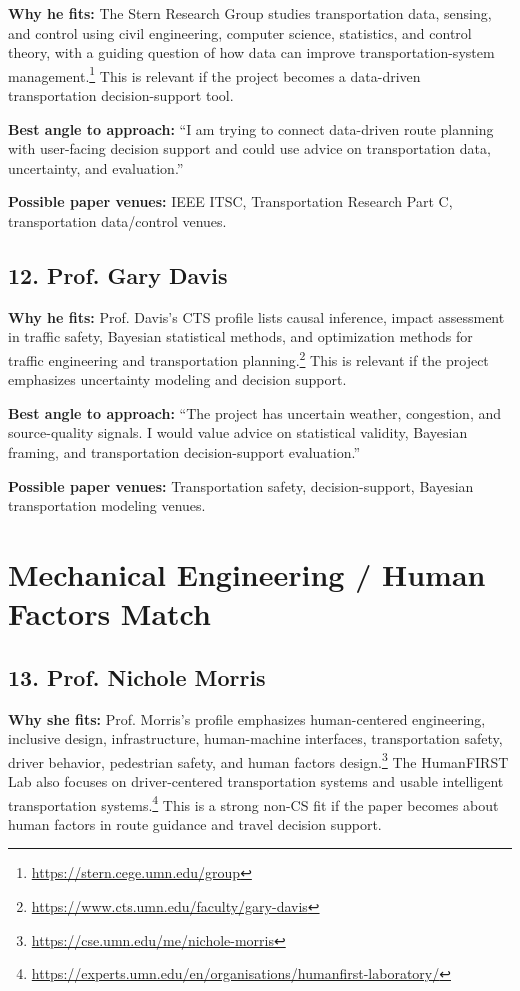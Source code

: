 \documentclass[11pt,a4paper]{article}
\begin{document}
\noindent \textbf{Why he fits:} The Stern Research Group studies transportation data, sensing, and control using civil engineering, computer science, statistics, and control theory, with a guiding question of how data can improve transportation-system management.\footnote{\url{https://stern.cege.umn.edu/group}} This is relevant if the project becomes a data-driven transportation decision-support tool.

\noindent \textbf{Best angle to approach:} ``I am trying to connect data-driven route planning with user-facing decision support and could use advice on transportation data, uncertainty, and evaluation.''

\noindent \textbf{Possible paper venues:} IEEE ITSC, Transportation Research Part C, transportation data/control venues.

\subsection*{12. Prof. Gary Davis}

\noindent \textbf{Why he fits:} Prof. Davis's CTS profile lists causal inference, impact assessment in traffic safety, Bayesian statistical methods, and optimization methods for traffic engineering and transportation planning.\footnote{\url{https://www.cts.umn.edu/faculty/gary-davis}} This is relevant if the project emphasizes uncertainty modeling and decision support.

\noindent \textbf{Best angle to approach:} ``The project has uncertain weather, congestion, and source-quality signals. I would value advice on statistical validity, Bayesian framing, and transportation decision-support evaluation.''

\noindent \textbf{Possible paper venues:} Transportation safety, decision-support, Bayesian transportation modeling venues.

\section*{Mechanical Engineering / Human Factors Match}

\subsection*{13. Prof. Nichole Morris}

\noindent \textbf{Why she fits:} Prof. Morris's profile emphasizes human-centered engineering, inclusive design, infrastructure, human-machine interfaces, transportation safety, driver behavior, pedestrian safety, and human factors design.\footnote{\url{https://cse.umn.edu/me/nichole-morris}} The HumanFIRST Lab also focuses on driver-centered transportation systems and usable intelligent transportation systems.\footnote{\url{https://experts.umn.edu/en/organisations/humanfirst-laboratory/}} This is a strong non-CS fit if the paper becomes about human factors in route guidance and travel decision support.
\end{document}
